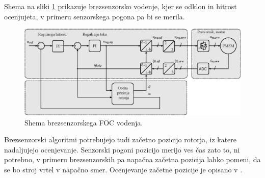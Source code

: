 \documentclass[a4paper,twoside,openright,12pt,slovene]{book}
\begin{document}
Shema na sliki \ref{FOCshema} prikazuje brezsenzorsko vodenje, kjer se odklon in hitrost ocenjujeta, v primeru senzorskega pogona pa bi se merila.

\begin{figure}[!htbp]
    \centering
    \includegraphics[width=1\columnwidth]{Slike/Inkscape/FOCsimple.eps}
    \caption{\label{FOCshema} Shema brezsenzorskega FOC vodenja.}
\end{figure}

Brezsenzorski algoritmi potrebujejo tudi začetno pozicijo rotorja, iz katere nadaljujejo ocenjevanje. Senzorski pogoni pozicijo merijo ves čas zato to, ni potrebno, v primeru brezsenzorskih pa napačna
začetna pozicija lahko pomeni, da se bo stroj vrtel v napačno smer. Ocenjevanje začetne pozicije je opisano v \cite{IPDBoussak}.



%
\end{document}
